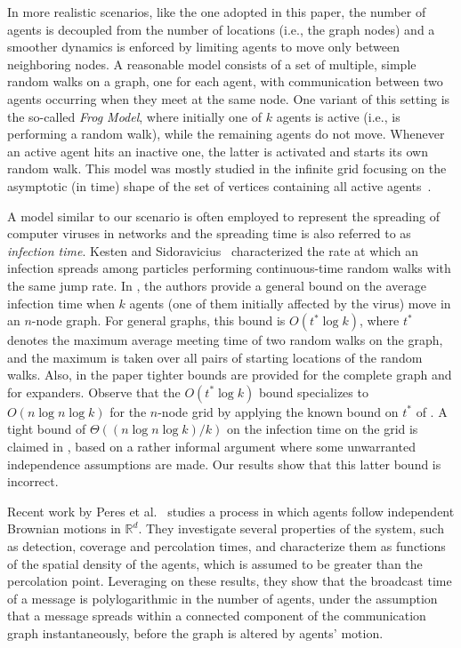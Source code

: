 \documentclass[11pt]{article}
\newcommand{\bigO}[1]{O\left(#1\right)}
\newcommand{\bigTh}[1]{\Theta\left(#1\right)}
\newcommand{\R}{\mathbb{R}}
\begin{document}
In more realistic scenarios, like the one adopted in this paper, the
number of agents is decoupled from the number of locations (i.e., the
graph nodes) and a smoother dynamics is enforced by limiting agents to
move only between neighboring nodes. A reasonable model consists of
a set of multiple, simple random walks on a graph, one for each agent,
with communication between two agents occurring when they meet at the
same node.  One variant of this setting is the so-called \emph{Frog
  Model},
where initially one of $k$ agents is active (i.e., is performing a
random walk), while the remaining agents do not move.  Whenever an
active agent hits an inactive one, the latter is activated and starts
its own random walk.  This model was mostly studied in the infinite
grid focusing on the asymptotic (in time) shape of the set of vertices
containing all active agents~\cite{AlvesMP02, KestenS03}.

A model similar to our scenario is often employed to represent the
spreading of computer viruses in networks and the spreading time is
also referred to as \emph{infection time}.  Kesten and
Sidoravicius~\cite{KestenS05} characterized the rate at which an
infection spreads among particles
performing continuous-time random walks with the same jump
rate.  In \cite{DimitriouNS06}, the authors provide a general bound on
the average infection time when $k$ agents (one of them initially
affected by the virus) move in an $n$-node graph.  For general graphs,
this bound is $\bigO{t^* \log k}$, where $t^*$ denotes the maximum
average meeting time of two random walks on the graph, and the maximum
is taken over all pairs of starting locations of the random walks.
Also, in the paper tighter bounds are provided for the complete graph
and for expanders. Observe that the $\bigO{t^* \log k}$ bound
specializes to $\bigO{n \log n \log k}$ for the $n$-node grid by
applying the known bound on $t^*$ of \cite{AldousF98}.  A tight bound
of $\bigTh{(n \log n \log k)/k}$ on the infection time on the grid is
claimed in \cite{WangKK08}, based on a rather informal argument where
some unwarranted independence assumptions are made.  Our results show
that this latter bound is incorrect.

Recent work by Peres et al.~\cite{PeresSSS11} studies a process in
which agents follow independent Brownian motions in $\R^d$.  They
investigate several properties of the system, such as detection,
coverage and percolation times, and characterize them as functions of
the spatial density of the agents, which is assumed to be greater than
the percolation point.  Leveraging on these results, they show that
the broadcast time of a message is polylogarithmic in the number of
agents, under the assumption that a message spreads within a connected
component of the communication graph instantaneously, before the graph
is altered by agents' motion.
\end{document}
